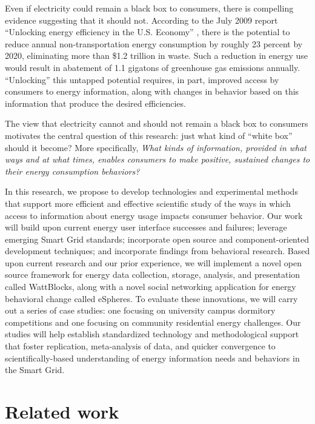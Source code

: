 Even if electricity could remain a black box to consumers, there is
compelling evidence suggesting that it should not.  According to the July
2009 report ``Unlocking energy efficiency in the U.S. Economy''
\cite{Granade09}, there is the potential to reduce annual
non-transportation energy consumption by roughly 23 percent by 2020,
eliminating more than \$1.2 trillion in waste.  Such a reduction in energy
use would result in abatement of 1.1 gigatons of greenhouse gas emissions
annually. ``Unlocking'' this untapped potential requires, in part, improved
access by consumers to energy information, along with changes in behavior
based on this information that produce the desired efficiencies.

The view that electricity cannot and should not remain a black box to
consumers motivates the central question of this research: just what kind of
``white box'' should it become?  More specifically, {\em What kinds of
  information, provided in what ways and at what times, enables consumers
  to make positive, sustained changes to their energy consumption
  behaviors?}

In this research, we propose to develop technologies and experimental
methods that support more efficient and effective scientific study of the
ways in which access to information about energy usage impacts consumer
behavior.  Our work will build upon current energy user interface successes
and failures; leverage emerging Smart Grid standards; incorporate open
source and component-oriented development techniques; and incorporate findings
from behavioral research. Based upon current research and our prior
experience, we will implement a novel open source framework for energy data
collection, storage, analysis, and presentation called WattBlocks, along
with a novel social networking application for energy behavioral change
called eSpheres.  To evaluate these innovations, we will carry out a series of case studies:
one focusing on university campus dormitory competitions and one focusing
on community residential energy challenges. Our studies will help establish standardized technology
and methodological support that foster replication, meta-analysis of data,
and quicker convergence to scientifically-based understanding of energy
information needs and behaviors in the Smart Grid.

\section{Related work}
\label{sec:related-work}

